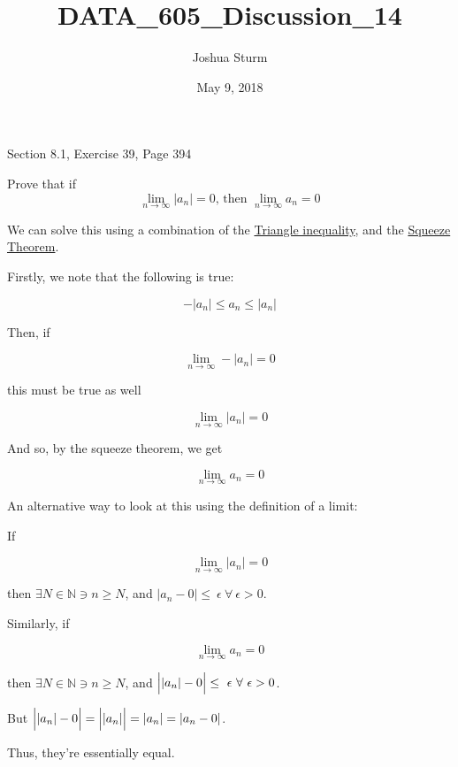 \documentclass[]{article}
\title{DATA\_605\_Discussion\_14}
\author{Joshua Sturm}
\date{May 9, 2018}
\begin{document}
\maketitle

Section 8.1, Exercise 39, Page 394

Prove that if \[
\lim_{n \to \infty} |a_n| = 0 \text{, then } \lim_{n \to \infty}a_n = 0
\]

We can solve this using a combination of the
\href{https://en.wikipedia.org/wiki/Triangle_inequality}{Triangle
inequality}, and the
\href{https://en.wikipedia.org/wiki/Squeeze_theorem}{Squeeze Theorem}.

Firstly, we note that the following is true:

\[
-|a_n| \leq a_n \leq |a_n|
\]

Then, if

\[
\lim_{n\to\infty} -|a_n| = 0
\]

this must be true as well

\[
\lim_{n\to\infty} |a_n| = 0
\]

And so, by the squeeze theorem, we get

\[
\lim_{n\to\infty} a_n = 0
\]

An alternative way to look at this using the definition of a limit:

If

\[
\lim_{n\to\infty} |a_n| = 0
\]

then \(\exists N \in \mathbb{N} \ni n \geq N\), and
\(|a_n - 0| \leq \ \epsilon \ \forall \ \epsilon > 0\).

Similarly, if

\[
\lim_{n\to\infty}a_n = 0
\]

then \(\exists N \in \mathbb{N} \ni n \geq N\), and
\(\Big{|}|a_n| - 0 \Big{|} \leq \ \epsilon \ \forall \ \epsilon > 0\).

But
\(\Big{|}|a_n| - 0 \Big{|} = \Big{|}|a_n|\Big{|} = |a_n| = |a_n - 0|\).

Thus, they're essentially equal.
\end{document}
